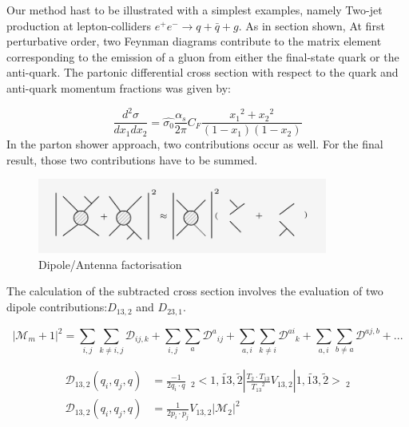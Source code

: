 Our method hast to be illustrated with a simplest examples, namely Two-jet production at lepton-colliders $ e^+ e^- \rightarrow q + \bar{q} + g $. As in section shown, At first perturbative order, two Feynman diagrams contribute to the matrix element corresponding to the emission of a gluon from either the final-state quark or the anti-quark. The partonic differential cross section with respect to the quark and anti-quark momentum fractions was given by: 

\begin{equation}
\frac{d^2 \sigma}{dx_1 dx_2}= \hat{\sigma_0}
\frac{\alpha_s}{2\pi} C_F \frac{{x_1}^2+{x_2}^2}{(1-x_1)(1-x_2)}
\end{equation}
In the parton shower approach, two contributions occur as well. For the final result, those two contributions have to be summed. 

\begin{figure}[h!]
\centering
\includegraphics[width=0.85\textwidth]{images/Intro/factorization.png}
\caption{Dipole/Antenna factorisation}
\end{figure}
The calculation of the subtracted cross section involves the evaluation of two dipole contributions:$ D_{13,2} $ and $ D_{23,1} $.

 \begin{equation}
 |\mathcal{M}_m+1|^2 = \displaystyle\sum\limits_{i,j} \displaystyle\sum\limits_{k\neq i,j} \mathcal{D}_{ij,k} +\displaystyle\sum\limits_{i,j} \displaystyle\sum\limits_{a} {\mathcal{D}^a}_{ij}+\displaystyle\sum\limits_{a,i} \displaystyle\sum\limits_{k\neq i} {\mathcal{D}^{ai}}_{k}+\displaystyle\sum\limits_{a,i} \displaystyle\sum\limits_{b\neq a} \mathcal{D}^{aj,b}+...
 \end{equation}

\begin{equation}
\begin{split}
\mathcal{D}_{13,2} (q_i,q_j,q)&= \frac{-1}{2q_i \cdot q} \:\:_2<1,\tilde{13},\tilde{2} |\frac{T_2 \cdot T_{13}}{{T_{13}}^2} V_{13,2}| 1,\tilde{13},\tilde{2} >\:_2\\
\mathcal{D}_{13,2} (q_i,q_j,q)&=\frac{1}{2p_i \cdot p_j} V_{13,2} |\mathcal{M}_{2}|^2
\end{split}
\end{equation}



